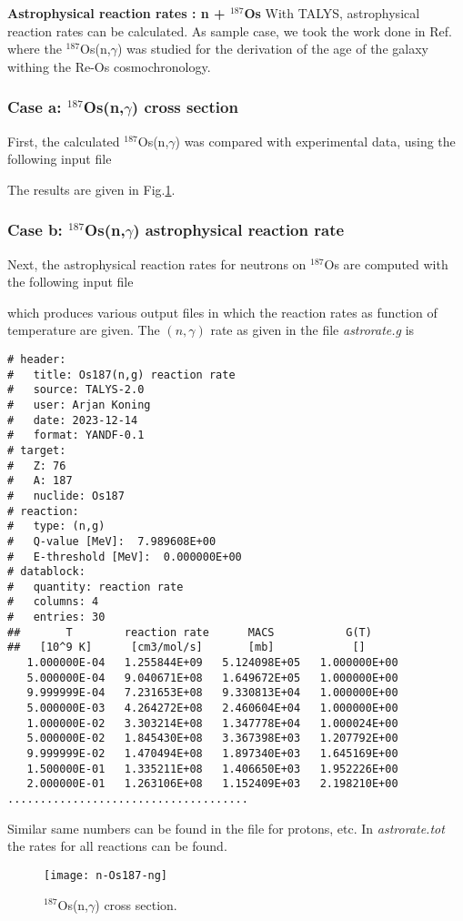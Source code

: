 \begin{samplecase}
{\bf Astrophysical reaction rates : n + ${}^{187}$Os}\newline
With TALYS, astrophysical reaction rates can be calculated.
As sample case, we took the work done in
Ref.\cite{Segawa2007} where the ${}^{187}$Os(n,$\gamma$) was studied for
the derivation of the age of the galaxy withing the
Re-Os cosmochronology. 
\subsubsection{Case a: ${}^{187}$Os(n,$\gamma$) cross section}
First, the calculated ${}^{187}$Os(n,$\gamma$) was compared with experimental data,
using the following input file


The results are given in Fig.\ref{os187ng}.
\subsubsection{Case b: ${}^{187}$Os(n,$\gamma$) astrophysical reaction rate}
Next, the astrophysical reaction rates for neutrons on ${}^{187}$Os are computed 
with the following input file


which produces various output files in which the reaction rates as 
function of temperature are given.
The $(n,\gamma )$ rate as given in the file {\em astrorate.g} is   
{\small \begin{verbatim}
# header:
#   title: Os187(n,g) reaction rate
#   source: TALYS-2.0
#   user: Arjan Koning
#   date: 2023-12-14
#   format: YANDF-0.1
# target:
#   Z: 76
#   A: 187
#   nuclide: Os187
# reaction:
#   type: (n,g)
#   Q-value [MeV]:  7.989608E+00
#   E-threshold [MeV]:  0.000000E+00
# datablock:
#   quantity: reaction rate
#   columns: 4
#   entries: 30
##       T        reaction rate      MACS           G(T)
##   [10^9 K]      [cm3/mol/s]       [mb]            []
   1.000000E-04   1.255844E+09   5.124098E+05   1.000000E+00
   5.000000E-04   9.040671E+08   1.649672E+05   1.000000E+00
   9.999999E-04   7.231653E+08   9.330813E+04   1.000000E+00
   5.000000E-03   4.264272E+08   2.460604E+04   1.000000E+00
   1.000000E-02   3.303214E+08   1.347778E+04   1.000024E+00
   5.000000E-02   1.845430E+08   3.367398E+03   1.207792E+00
   9.999999E-02   1.470494E+08   1.897340E+03   1.645169E+00
   1.500000E-01   1.335211E+08   1.406650E+03   1.952226E+00
   2.000000E-01   1.263106E+08   1.152409E+03   2.198210E+00
.....................................
\end{verbatim} } \renewcommand{\baselinestretch}{1.07}\small\normalsize
\noindent
Similar same numbers can be found in the file for protons, etc.
In {\em astrorate.tot} the rates for all reactions can be found.

\end{samplecase}
\begin{figure}
\centering\texttt{[image: n-Os187-ng]}
\caption{${}^{187}$Os(n,$\gamma$) cross section.}
\label{os187ng}
\end{figure}

